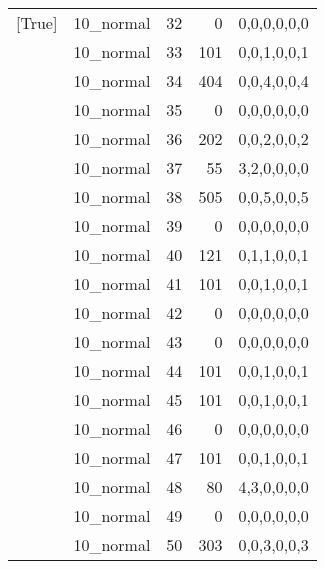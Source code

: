 \begin{tabular}{llrrl}
 [True]          & 10\_normal           &            32 &                     0 & 0,0,0,0,0,0   \\
 [True]          & 10\_normal           &            33 &                   101 & 0,0,1,0,0,1   \\
 [True]          & 10\_normal           &            34 &                   404 & 0,0,4,0,0,4   \\
 [True]          & 10\_normal           &            35 &                     0 & 0,0,0,0,0,0   \\
 [True]          & 10\_normal           &            36 &                   202 & 0,0,2,0,0,2   \\
 [True]          & 10\_normal           &            37 &                    55 & 3,2,0,0,0,0   \\
 [True]          & 10\_normal           &            38 &                   505 & 0,0,5,0,0,5   \\
 [True]          & 10\_normal           &            39 &                     0 & 0,0,0,0,0,0   \\
 [True]          & 10\_normal           &            40 &                   121 & 0,1,1,0,0,1   \\
 [True]          & 10\_normal           &            41 &                   101 & 0,0,1,0,0,1   \\
 [True]          & 10\_normal           &            42 &                     0 & 0,0,0,0,0,0   \\
 [True]          & 10\_normal           &            43 &                     0 & 0,0,0,0,0,0   \\
 [True]          & 10\_normal           &            44 &                   101 & 0,0,1,0,0,1   \\
 [True]          & 10\_normal           &            45 &                   101 & 0,0,1,0,0,1   \\
 [True]          & 10\_normal           &            46 &                     0 & 0,0,0,0,0,0   \\
 [True]          & 10\_normal           &            47 &                   101 & 0,0,1,0,0,1   \\
 [True]          & 10\_normal           &            48 &                    80 & 4,3,0,0,0,0   \\
 [True]          & 10\_normal           &            49 &                     0 & 0,0,0,0,0,0   \\
 [True]          & 10\_normal           &            50 &                   303 & 0,0,3,0,0,3   \\

\end{tabular}
